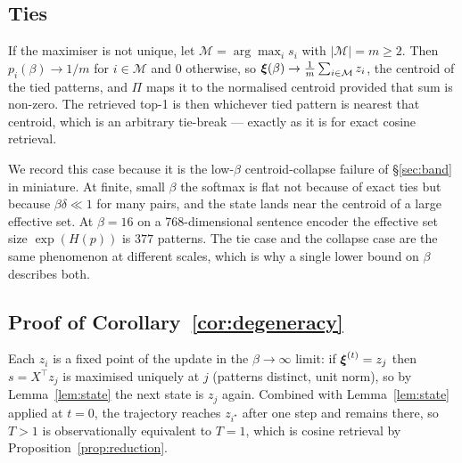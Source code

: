 \subsection{Ties}

If the maximiser is not unique, let $\mathcal{M} = \arg\max_i s_i$ with $|\mathcal{M}| = m
\ge 2$. Then $p_i(\beta) \to 1/m$ for $i\in\mathcal{M}$ and $0$ otherwise, so
$\boldsymbol{\xi}(\beta) \to \frac{1}{m}\sum_{i\in\mathcal{M}} z_i$, the centroid of the tied patterns,
and $\Pi$ maps it to the normalised centroid provided that sum is non-zero. The retrieved
top-1 is then whichever tied pattern is nearest that centroid, which is an arbitrary
tie-break --- exactly as it is for exact cosine retrieval.

We record this case because it is the low-$\beta$ centroid-collapse failure of
\S\ref{sec:band} in miniature. At finite, small $\beta$ the softmax is flat not because of
exact ties but because $\beta\delta \ll 1$ for many pairs, and the state lands near the
centroid of a large effective set. At $\beta{=}16$ on a 768-dimensional sentence encoder the
effective set size $\exp(H(p))$ is $377$ patterns. The tie case and the collapse case are
the same phenomenon at different scales, which is why a single lower bound on $\beta$
describes both.

\subsection{Proof of Corollary~\ref{cor:degeneracy}}

Each $z_i$ is a fixed point of the update in the $\beta\to\infty$ limit: if
$\boldsymbol{\xi}^{(t)} = z_j$ then $s = X^{\!\top}z_j$ is maximised uniquely at $j$ (patterns distinct,
unit norm), so by Lemma~\ref{lem:state} the next state is $z_j$ again. Combined with
Lemma~\ref{lem:state} applied at $t=0$, the trajectory reaches $z_{i^\star}$ after one step
and remains there, so $T>1$ is observationally equivalent to $T=1$, which is cosine
retrieval by Proposition~\ref{prop:reduction}.

